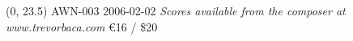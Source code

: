 \documentclass[10pt]{article}
\begin{document}
\begin{textblock}{23}(0, 23.5)
AWN-003 2006-02-02 \hfill
\textit{Scores available from the composer at www.trevorbaca.com} \hfill
\euro 16 / \$20
\end{textblock}
\end{document}
